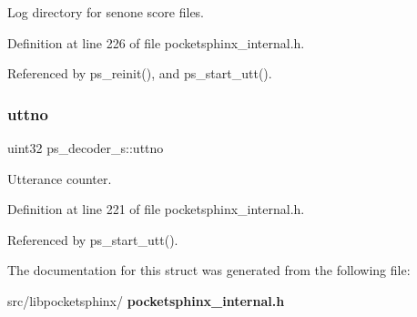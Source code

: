 Log directory for senone score files. 



Definition at line 226 of file pocketsphinx\+\_\+internal.\+h.



Referenced by ps\+\_\+reinit(), and ps\+\_\+start\+\_\+utt().

\mbox{\label{structps__decoder__s_a0f597370dd162c2799efe216c9b991fc}} 
\subsubsection{uttno}
{\footnotesize\ttfamily uint32 ps\+\_\+decoder\+\_\+s\+::uttno}



Utterance counter. 



Definition at line 221 of file pocketsphinx\+\_\+internal.\+h.



Referenced by ps\+\_\+start\+\_\+utt().



The documentation for this struct was generated from the following file\+:\begin{DoxyCompactItemize}
\item 
src/libpocketsphinx/\textbf{ pocketsphinx\+\_\+internal.\+h}\end{DoxyCompactItemize}
